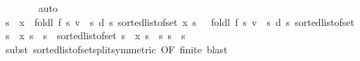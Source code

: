\begin{isabellebody}
\ \ \ \ \ \ \isamarkupfalse%
\ auto\isanewline
\ \ \ \ \isamarkupfalse%
\ {\isachardoublequoteopen}s\ {\isacharless}{\kern0pt}\ x\ {\isasymLongrightarrow}\ foldl\ {\isacharquery}{\kern0pt}f\ {\isacharparenleft}{\kern0pt}{\isasymlambda}s{\isachardot}{\kern0pt}\ {\isacharparenleft}{\kern0pt}v\ {\isachardollar}{\kern0pt}\ s{\isacharcomma}{\kern0pt}\ d\ s{\isacharparenright}{\kern0pt}{\isacharparenright}{\kern0pt}\ {\isacharparenleft}{\kern0pt}sorted{\isacharunderscore}{\kern0pt}list{\isacharunderscore}{\kern0pt}of{\isacharunderscore}{\kern0pt}set\ {\isacharbraceleft}{\kern0pt}{\isachardot}{\kern0pt}{\isachardot}{\kern0pt}x{\isacharprime}{\kern0pt}{\isacharbraceright}{\kern0pt}{\isacharparenright}{\kern0pt}\ s\ {\isacharequal}{\kern0pt}\ \ foldl\ {\isacharquery}{\kern0pt}f\ {\isacharparenleft}{\kern0pt}{\isasymlambda}s{\isachardot}{\kern0pt}\ {\isacharparenleft}{\kern0pt}v\ {\isachardollar}{\kern0pt}\ s{\isacharcomma}{\kern0pt}\ d\ s{\isacharparenright}{\kern0pt}{\isacharparenright}{\kern0pt}\ {\isacharparenleft}{\kern0pt}sorted{\isacharunderscore}{\kern0pt}list{\isacharunderscore}{\kern0pt}of{\isacharunderscore}{\kern0pt}set\ {\isacharbraceleft}{\kern0pt}s{\isacharprime}{\kern0pt}\ {\isasymin}\ {\isacharbraceleft}{\kern0pt}{\isachardot}{\kern0pt}{\isachardot}{\kern0pt}x{\isacharprime}{\kern0pt}{\isacharbraceright}{\kern0pt}{\isachardot}{\kern0pt}\ s{\isacharprime}{\kern0pt}\ {\isasymle}\ s{\isacharbraceright}{\kern0pt}\ {\isacharat}{\kern0pt}\ sorted{\isacharunderscore}{\kern0pt}list{\isacharunderscore}{\kern0pt}of{\isacharunderscore}{\kern0pt}set\ {\isacharbraceleft}{\kern0pt}s{\isacharprime}{\kern0pt}\ {\isasymin}\ {\isacharbraceleft}{\kern0pt}{\isachardot}{\kern0pt}{\isachardot}{\kern0pt}x{\isacharprime}{\kern0pt}{\isacharbraceright}{\kern0pt}{\isachardot}{\kern0pt}\ s\ {\isacharless}{\kern0pt}\ s{\isacharprime}{\kern0pt}{\isacharbraceright}{\kern0pt}{\isacharparenright}{\kern0pt}\ s{\isachardoublequoteclose}\ \ s\isanewline
\ \ \ \ \ \ \isamarkupfalse%
\ {\isacharparenleft}{\kern0pt}subst\ sorted{\isacharunderscore}{\kern0pt}list{\isacharunderscore}{\kern0pt}of{\isacharunderscore}{\kern0pt}set{\isacharunderscore}{\kern0pt}split{\isacharprime}{\kern0pt}{\isacharbrackleft}{\kern0pt}symmetric{\isacharcomma}{\kern0pt}\ OF\ finite{\isacharbrackright}{\kern0pt}{\isacharparenright}{\kern0pt}\ blast\isanewline
\ \ \ \ \isamarkupfalse%

\end{isabellebody}
